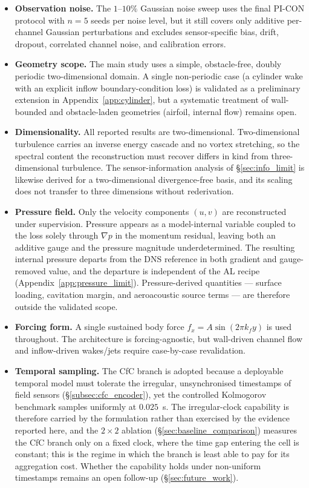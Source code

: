 \begin{itemize}
    \item \textbf{Observation noise.} The $1$--$10\%$ Gaussian noise sweep uses the final PI-CON protocol with $n=5$ seeds per noise level, but it still covers only additive per-channel Gaussian perturbations and excludes sensor-specific bias, drift, dropout, correlated channel noise, and calibration errors.
    \item \textbf{Geometry scope.} The main study uses a simple, obstacle-free, doubly periodic two-dimensional domain. A single non-periodic case (a cylinder wake with an explicit inflow boundary-condition loss) is validated as a preliminary extension in Appendix~\ref{app:cylinder}, but a systematic treatment of wall-bounded and obstacle-laden geometries (airfoil, internal flow) remains open.
    \item \textbf{Dimensionality.} All reported results are two-dimensional. Two-dimensional turbulence carries an inverse energy cascade and no vortex stretching, so the spectral content the reconstruction must recover differs in kind from three-dimensional turbulence. The sensor-information analysis of \S\ref{sec:info_limit} is likewise derived for a two-dimensional divergence-free basis, and its scaling does not transfer to three dimensions without rederivation.
    \item \textbf{Pressure field.} Only the velocity components $(u,v)$ are reconstructed under supervision. Pressure appears as a model-internal variable coupled to the loss solely through $\nabla p$ in the momentum residual, leaving both an additive gauge and the pressure magnitude underdetermined. The resulting internal pressure departs from the DNS reference in both gradient and gauge-removed value, and the departure is independent of the AL recipe (Appendix~\ref{app:pressure_limit}). Pressure-derived quantities --- surface loading, cavitation margin, and aeroacoustic source terms --- are therefore outside the validated scope.
    \item \textbf{Forcing form.} A single sustained body force $f_x = A\sin(2\pi k_f y)$ is used throughout. The architecture is forcing-agnostic, but wall-driven channel flow and inflow-driven wakes/jets require case-by-case revalidation.
    \item \textbf{Temporal sampling.} The CfC branch is adopted because a deployable temporal model must tolerate the irregular, unsynchronised timestamps of field sensors (\S\ref{subsec:cfc_encoder}), yet the controlled Kolmogorov benchmark samples uniformly at $0.025$~s. The irregular-clock capability is therefore carried by the formulation rather than exercised by the evidence reported here, and the $2\times2$ ablation (\S\ref{sec:baseline_comparison}) measures the CfC branch only on a fixed clock, where the time gap entering the cell is constant; this is the regime in which the branch is least able to pay for its aggregation cost. Whether the capability holds under non-uniform timestamps remains an open follow-up (\S\ref{sec:future_work}).

\end{itemize}
